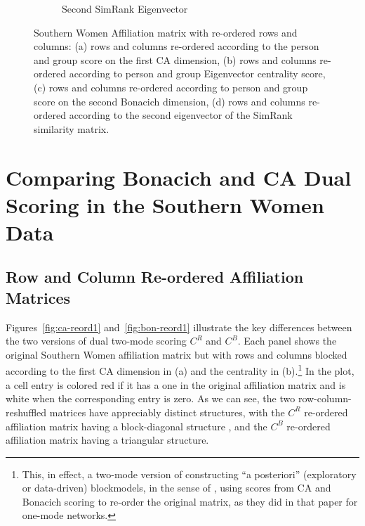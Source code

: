 \documentclass[a4paper,fleqn]{cas-sc}
\begin{document}
\begin{figure}[ht!]
\begin{subfigure}[b]{0.45\textwidth}
            \caption{Second SimRank Eigenvector}
            \label{fig:sr-reord1}
    \end{subfigure}
    \caption{Southern Women Affiliation matrix with re-ordered rows and columns: (a) rows and columns re-ordered according to the person and group score on the first CA dimension, (b) rows and columns re-ordered according to person and group Eigenvector centrality score, (c) rows and columns re-ordered according to person and group score on the second Bonacich dimension, (d) rows and columns re-ordered according to the second eigenvector of the SimRank similarity matrix.}
    \label{fig:ca-v-bon}
\end{figure}

\section{Comparing Bonacich and CA Dual Scoring in the Southern Women Data} \label{sec:comparing}
\subsection{Row and Column Re-ordered Affiliation Matrices} 
Figures~\ref{fig:ca-reord1} and~\ref{fig:bon-reord1} illustrate the key differences between the two versions of dual two-mode scoring $C^R$ and $C^B$. Each panel shows the original Southern Women affiliation matrix but with rows and columns blocked according to the first CA dimension in (a) and the \citet{bonacich1991simultaneous} centrality in (b).\footnote{This, in effect, a two-mode version of constructing ``a posteriori'' (exploratory or data-driven) blockmodels, in the sense of \citet{wasserman1987stochastic}, using scores from CA and Bonacich scoring to re-order the original matrix, as they did in that paper for one-mode networks.} In the plot, a cell entry is colored red if it has a one in the original affiliation matrix and is white when the corresponding entry is zero. As we can see, the two row-column-reshuffled matrices have appreciably distinct structures, with the $C^R$ re-ordered affiliation matrix having a block-diagonal structure \citep[34]{wasserman1990correspondence}, and the $C^B$ re-ordered affiliation matrix having a triangular structure. 
\end{document}
